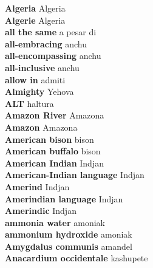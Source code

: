 \textbf{ Algeria  } Algeria \\
\textbf{ Algerie  } Algeria \\
\textbf{ all the same  } a pesar di \\
\textbf{ all-embracing  } anchu \\
\textbf{ all-encompassing  } anchu \\
\textbf{ all-inclusive  } anchu \\
\textbf{ allow in  } admiti \\
\textbf{ Almighty  } Yehova \\
\textbf{ ALT  } haltura \\
\textbf{ Amazon River  } Amazona \\
\textbf{ Amazon  } Amazona \\
\textbf{ American bison  } bison \\
\textbf{ American buffalo  } bison \\
\textbf{ American Indian  } Indjan \\
\textbf{ American-Indian language  } Indjan \\
\textbf{ Amerind  } Indjan \\
\textbf{ Amerindian language  } Indjan \\
\textbf{ Amerindic  } Indjan \\
\textbf{ ammonia water  } amoniak \\
\textbf{ ammonium hydroxide  } amoniak \\
\textbf{ Amygdalus communis  } amandel \\
\textbf{ Anacardium occidentale  } kashupete \\
